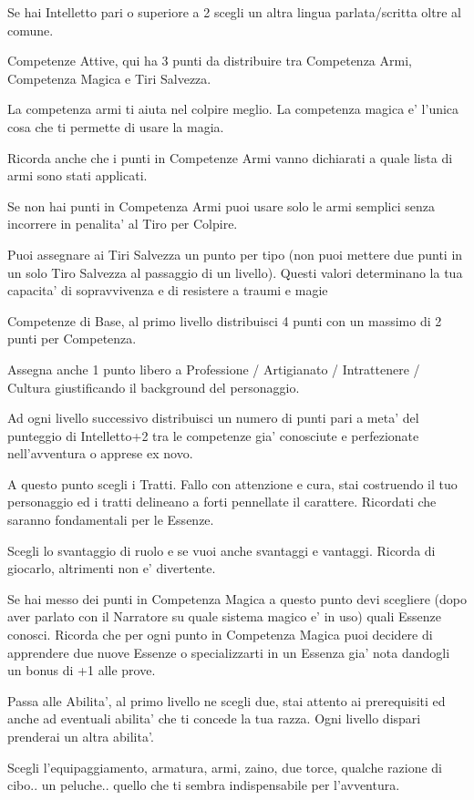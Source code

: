 \documentclass[a4paper,11pt,twoside,openany]{book}
\begin{document}
Se hai Intelletto pari o superiore a 2 scegli un altra lingua parlata/scritta oltre al comune.

Competenze Attive, qui ha 3 punti da distribuire tra Competenza Armi, Competenza Magica e Tiri Salvezza.

La competenza armi ti aiuta nel colpire meglio. La competenza magica e' l'unica cosa che ti permette di usare la magia.

Ricorda anche che i punti in Competenze Armi vanno dichiarati a quale lista di armi sono stati applicati.

Se non hai punti in Competenza Armi puoi usare solo le armi semplici senza incorrere in penalita' al Tiro per Colpire.

Puoi assegnare ai Tiri Salvezza un punto per tipo (non puoi mettere due punti in un solo Tiro Salvezza al passaggio di un livello). Questi valori determinano la tua capacita' di sopravvivenza e di resistere a traumi e magie

Competenze di Base, al primo livello distribuisci 4 punti con un massimo di 2 punti per Competenza.

Assegna anche 1 punto libero a Professione / Artigianato / Intrattenere / Cultura giustificando il background del personaggio.

Ad ogni livello successivo distribuisci un numero di punti pari a meta' del punteggio di Intelletto+2 tra le competenze gia' conosciute e perfezionate nell'avventura o apprese ex novo.

A questo punto scegli i Tratti. Fallo con attenzione e cura, stai costruendo il tuo personaggio ed i tratti delineano a forti pennellate il carattere. Ricordati che saranno fondamentali per le Essenze.

Scegli lo svantaggio di ruolo e se vuoi anche svantaggi e vantaggi. Ricorda di giocarlo, altrimenti non e' divertente.

Se hai messo dei punti in Competenza Magica a questo punto devi scegliere (dopo aver parlato con il Narratore su quale sistema magico e' in uso) quali Essenze conosci. Ricorda che per ogni punto in Competenza Magica puoi decidere di apprendere due nuove Essenze o specializzarti in un Essenza gia' nota dandogli un bonus di +1 alle prove.

Passa alle Abilita', al primo livello ne scegli due, stai attento ai prerequisiti ed anche ad eventuali abilita' che ti concede la tua razza. Ogni livello dispari prenderai un altra abilita'.

Scegli l'equipaggiamento, armatura, armi, zaino, due torce, qualche razione di cibo.. un peluche.. quello che ti sembra indispensabile per l'avventura.
\end{document}
